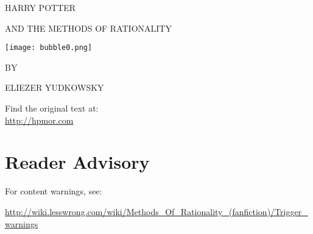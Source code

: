\begin{center}
\thispagestyle{empty}
{\hp
\Huge\MakeUppercase{Harry Potter}\vspace*{0.5cm}

\Large\MakeUppercase{and the Methods of Rationality} %
 
\texttt{[image: bubble0.png]} 

\Large BY \vspace*{.25cm}

\huge ELIEZER YUDKOWSKY%

\normalsize
}

\vspace{3cm}
Find the original text at:\\
\url{http://hpmor.com} \\

\end{center}

\chapter*{Reader Advisory}
\thispagestyle{empty}
For content warnings, see: \begin{center}\url{http://wiki.lesswrong.com/wiki/Methods\_Of\_Rationality\_(fanfiction)/Trigger\_warnings}\end{center}
